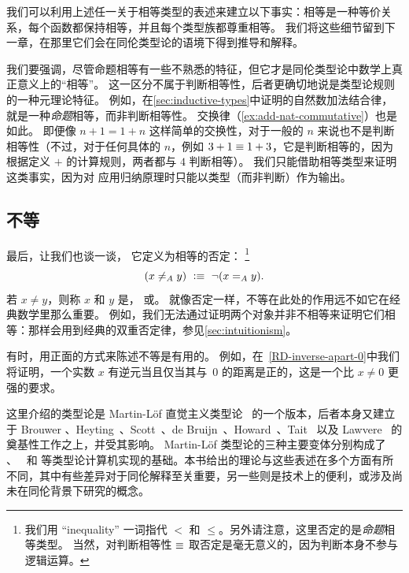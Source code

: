 我们可以利用上述任一关于相等类型的表述来建立以下事实：相等是一种等价关系，每个函数都保持相等，并且每个类型族都尊重相等。
我们将这些细节留到下一章，在那里它们会在同伦类型论的语境下得到推导和解释。

\begin{rmk}\label{rmk:propeq-vs-jdeq}
  我们要强调，尽管命题相等有一些不熟悉的特征，但它才是同伦类型论中数学上真正意义上的``相等''。
  这一区分不属于判断相等性，后者更确切地说是类型论规则的一种元理论特征。
  例如，在\cref{sec:inductive-types}中证明的自然数加法结合律，就是一种\emph{命题}相等，而非判断相等性。
  交换律（\cref{ex:add-nat-commutative}）也是如此。
  即便像 $n+1=1+n$ 这样简单的交换性，对于一般的 $n$ 来说也不是判断相等性（不过，对于任何具体的 $n$，例如 $3+1\jdeq 1+3$，它是判断相等的，因为根据定义 $+$ 的计算规则，两者都与 $4$ 判断相等）。
  我们只能借助相等类型来证明这类事实，因为对 \nat 应用归纳原理时只能以类型（而非判断）作为输出。
\end{rmk}

\subsection{不等}
\label{sec:disequality}

最后，让我们也谈一谈，
%
它定义为相等的否定：%
\footnote{我们用 ``inequality'' 一词指代 $<$ 和 $\leq$。另外请注意，这里否定的是\emph{命题}相等类型。
当然，对判断相等性 $\jdeq$ 取否定是毫无意义的，因为判断本身不参与逻辑运算。}
%
\begin{equation*}
  (x \neq_A y) \ \defeq\ \lnot (\id[A]{x}{y}).
\end{equation*}
若 $x\neq y$，则称 $x$ 和 $y$ 是，
%
或。
%
就像否定一样，不等在此处的作用远不如它在经典数学里那么重要。
例如，我们无法通过证明两个对象并非不相等来证明它们相等：那样会用到经典的双重否定律，参见\cref{sec:intuitionism}。

有时，用正面的方式来陈述不等是有用的。
例如，在~\cref{RD-inverse-apart-0}中我们将证明，一个实数 $x$ 有逆元当且仅当其与~$0$ 的距离是正的，这是一个比 $x \neq 0$ 更强的要求。

%

\sectionNotes

这里介绍的类型论是 Martin-L\"{o}f 直觉主义类型论~\cite{Martin-Lof-1972,Martin-Lof-1973,Martin-Lof-1979,martin-lof:bibliopolis} 的一个版本，后者本身又建立于 Brouwer \cite{beeson}、Heyting~\cite{heyting1966intuitionism}、Scott~\cite{scott70}、de Bruijn~\cite{deBruijn-1973}、Howard~\cite{howard:pat}、Tait~\cite{Tait-1966,Tait-1968} 以及 Lawvere~\cite{lawvere:adjinfound} 的奠基性工作之上，并受其影响。
%
Martin-L\"{o}f 类型论的三种主要变体分别构成了 \NuPRL \cite{constable+86nuprl-book}、\Coq~\cite{Coq} 和 \Agda \cite{norell2007towards} 等类型论计算机实现的基础。本书给出的理论与这些表述在多个方面有所不同，其中有些差异对于同伦解释至关重要，另一些则是技术上的便利，或涉及尚未在同伦背景下研究的概念。

